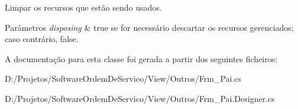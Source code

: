 Limpar os recursos que estão sendo usados. 


\begin{DoxyParams}{Parâmetros}
{\em disposing} & true se for necessário descartar os recursos gerenciados; caso contrário, false.\\
\hline
\end{DoxyParams}


A documentação para esta classe foi gerada a partir dos seguintes ficheiros\+:\begin{DoxyCompactItemize}
\item 
D\+:/\+Projetos/\+Software\+Ordem\+De\+Servico/\+View/\+Outros/Frm\+\_\+\+Pai.\+cs\item 
D\+:/\+Projetos/\+Software\+Ordem\+De\+Servico/\+View/\+Outros/Frm\+\_\+\+Pai.\+Designer.\+cs\end{DoxyCompactItemize}

